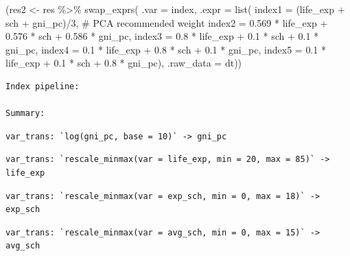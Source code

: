 \documentclass[
]{article}
\newenvironment{Shaded}{\begin{snugshade}}{\end{snugshade}}
\newcommand{\AttributeTok}[1]{\textcolor[rgb]{0.40,0.45,0.13}{#1}}
\newcommand{\CommentTok}[1]{\textcolor[rgb]{0.37,0.37,0.37}{#1}}
\newcommand{\DecValTok}[1]{\textcolor[rgb]{0.68,0.00,0.00}{#1}}
\newcommand{\FloatTok}[1]{\textcolor[rgb]{0.68,0.00,0.00}{#1}}
\newcommand{\FunctionTok}[1]{\textcolor[rgb]{0.28,0.35,0.67}{#1}}
\newcommand{\NormalTok}[1]{\textcolor[rgb]{0.00,0.23,0.31}{#1}}
\newcommand{\OtherTok}[1]{\textcolor[rgb]{0.00,0.23,0.31}{#1}}
\newcommand{\SpecialCharTok}[1]{\textcolor[rgb]{0.37,0.37,0.37}{#1}}
\begin{document}
\begin{Shaded}
\begin{Highlighting}[]
\NormalTok{(res2 }\OtherTok{\textless{}{-}}\NormalTok{ res }\SpecialCharTok{\%\textgreater{}\%}
  \FunctionTok{swap\_exprs}\NormalTok{(}
    \AttributeTok{.var =}\NormalTok{ index,}
    \AttributeTok{.expr =} \FunctionTok{list}\NormalTok{(}
      \AttributeTok{index1 =}\NormalTok{ (life\_exp }\SpecialCharTok{+}\NormalTok{ sch }\SpecialCharTok{+}\NormalTok{ gni\_pc)}\SpecialCharTok{/}\DecValTok{3}\NormalTok{,}
      \CommentTok{\# PCA recommended weight}
      \AttributeTok{index2 =} \FloatTok{0.569} \SpecialCharTok{*}\NormalTok{ life\_exp }\SpecialCharTok{+} \FloatTok{0.576} \SpecialCharTok{*}\NormalTok{ sch }\SpecialCharTok{+} \FloatTok{0.586} \SpecialCharTok{*}\NormalTok{ gni\_pc, }
      \AttributeTok{index3 =} \FloatTok{0.8} \SpecialCharTok{*}\NormalTok{ life\_exp }\SpecialCharTok{+} \FloatTok{0.1} \SpecialCharTok{*}\NormalTok{ sch }\SpecialCharTok{+} \FloatTok{0.1} \SpecialCharTok{*}\NormalTok{ gni\_pc,}
      \AttributeTok{index4 =} \FloatTok{0.1} \SpecialCharTok{*}\NormalTok{ life\_exp }\SpecialCharTok{+} \FloatTok{0.8} \SpecialCharTok{*}\NormalTok{ sch }\SpecialCharTok{+} \FloatTok{0.1} \SpecialCharTok{*}\NormalTok{ gni\_pc,}
      \AttributeTok{index5 =} \FloatTok{0.1} \SpecialCharTok{*}\NormalTok{ life\_exp }\SpecialCharTok{+} \FloatTok{0.1} \SpecialCharTok{*}\NormalTok{ sch }\SpecialCharTok{+} \FloatTok{0.8} \SpecialCharTok{*}\NormalTok{ gni\_pc),}
    \AttributeTok{.raw\_data =}\NormalTok{ dt))}
\end{Highlighting}
\end{Shaded}

\begin{verbatim}
Index pipeline: 

Summary: 
\end{verbatim}

\begin{verbatim}
var_trans: `log(gni_pc, base = 10)` -> gni_pc
\end{verbatim}

\begin{verbatim}
var_trans: `rescale_minmax(var = life_exp, min = 20, max = 85)` -> life_exp
\end{verbatim}

\begin{verbatim}
var_trans: `rescale_minmax(var = exp_sch, min = 0, max = 18)` -> exp_sch
\end{verbatim}

\begin{verbatim}
var_trans: `rescale_minmax(var = avg_sch, min = 0, max = 15)` -> avg_sch
\end{verbatim}
\end{document}
